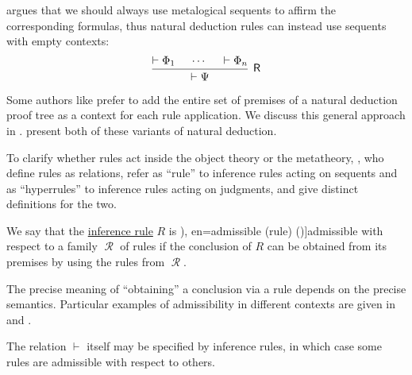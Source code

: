 \begin{remark}
   argues that we should always use metalogical sequents to affirm the corresponding formulas, thus natural deduction rules can instead use sequents with empty contexts:
  \begin{equation*}
    \begin{prooftree}
      \hypo{ \vdash \Phi_1 }
      \hypo{ \cdots }
      \hypo{ \vdash \Phi_n }
      \infer3[\logic{R}]{ \vdash \Psi }
    \end{prooftree}
  \end{equation*}

  Some authors like  prefer to add the entire set of premises of a natural deduction proof tree as a context for each rule application. We discuss this general approach in .  present both of these variants of natural deduction.

  To clarify whether rules act inside the object theory or the metatheory, , who define rules as relations, refer as \enquote{rule} to inference rules acting on sequents and as \enquote{hyperrules} to inference rules acting on judgments, and give distinct definitions for the two.
\end{remark}

\begin{concept}\label{con:inference_rule_admissibility}\mimprovised
  We say that the \hyperref[def:inference_rule]{inference rule} \( R \) is \term[ru=допустимое (правило) (\cite[252]{Герасимов2011Вычислимость}), en=admissible (rule) (\cite[76]{TroelstraSchwichtenberg2000BasicProofTheory})]{admissible} with respect to a family \( \mscrR \) of rules if the conclusion of \( R \) can be obtained from its premises by using the rules from \( \mscrR \).
\end{concept}
\begin{comments}
  \item The precise meaning of \enquote{obtaining} a conclusion via a rule depends on the precise semantics. Particular examples of admissibility in different contexts are given in  and .

  \item The relation \( {\vdash} \) itself may be specified by inference rules, in which case some rules are admissible with respect to others.
\end{comments}

